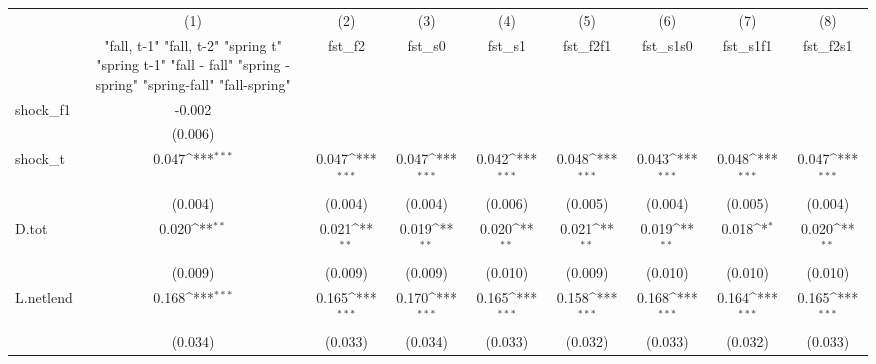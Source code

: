 {
\def\sym#1{\ifmmode^{#1}\else\(^{#1}\)\fi}
\begin{tabular}{l*{8}{c}}
\toprule
            &\multicolumn{1}{c}{(1)}&\multicolumn{1}{c}{(2)}&\multicolumn{1}{c}{(3)}&\multicolumn{1}{c}{(4)}&\multicolumn{1}{c}{(5)}&\multicolumn{1}{c}{(6)}&\multicolumn{1}{c}{(7)}&\multicolumn{1}{c}{(8)}\\
            &\multicolumn{1}{c}{  "fall, t-1" "fall, t-2" "spring t" "spring t-1"  "fall - fall" "spring - spring" "spring-fall" "fall-spring" }&\multicolumn{1}{c}{fst\_f2}&\multicolumn{1}{c}{fst\_s0}&\multicolumn{1}{c}{fst\_s1}&\multicolumn{1}{c}{fst\_f2f1}&\multicolumn{1}{c}{fst\_s1s0}&\multicolumn{1}{c}{fst\_s1f1}&\multicolumn{1}{c}{fst\_f2s1}\\
\midrule
shock\_f1    &      -0.002         &                     &                     &                     &                     &                     &                     &                     \\
            &     (0.006)         &                     &                     &                     &                     &                     &                     &                     \\
\addlinespace
shock\_t     &       0.047\sym{***}&       0.047\sym{***}&       0.047\sym{***}&       0.042\sym{***}&       0.048\sym{***}&       0.043\sym{***}&       0.048\sym{***}&       0.047\sym{***}\\
            &     (0.004)         &     (0.004)         &     (0.004)         &     (0.006)         &     (0.005)         &     (0.004)         &     (0.005)         &     (0.004)         \\
\addlinespace
D.tot       &       0.020\sym{**} &       0.021\sym{**} &       0.019\sym{**} &       0.020\sym{**} &       0.021\sym{**} &       0.019\sym{**} &       0.018\sym{*}  &       0.020\sym{**} \\
            &     (0.009)         &     (0.009)         &     (0.009)         &     (0.010)         &     (0.009)         &     (0.010)         &     (0.010)         &     (0.010)         \\
\addlinespace
L.netlend   &       0.168\sym{***}&       0.165\sym{***}&       0.170\sym{***}&       0.165\sym{***}&       0.158\sym{***}&       0.168\sym{***}&       0.164\sym{***}&       0.165\sym{***}\\
            &     (0.034)         &     (0.033)         &     (0.034)         &     (0.033)         &     (0.032)         &     (0.033)         &     (0.032)         &     (0.033)         \\

\end{tabular}}
